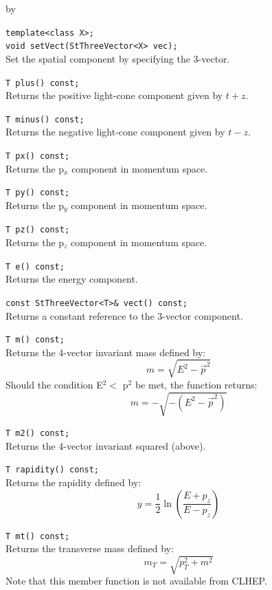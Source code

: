 \documentclass[twoside]{article}
\newcommand{\entrylabel}[1]{\mbox{\textbf{{#1}}}\hfil}%
\newenvironment{entry}
{\begin{list}{}%
    {\renewcommand{\makelabel}{\entrylabel}%
     \setlength{\labelwidth}{90pt}%
     \setlength{\leftmargin}{\labelwidth}
     \advance\leftmargin by \labelsep%
      }%
    }%
  {\end{list}}
\newcommand{\Entrylabel}[1]%
{\raisebox{0pt}[1ex][0pt]{\makebox[\labelwidth][l]%
    {\parbox[t]{\labelwidth}{\hspace{0pt}\textbf{{#1}}}}}}
\newenvironment{Entry}%
{\renewcommand{\entrylabel}{\Entrylabel}\begin{entry}}%
  {\end{entry}}
\begin{document}
\begin{Entry}
    \verb+template<class X>;+\\
    \verb+void setVect(StThreeVector<X> vec);+\\
    Set the spatial component by specifying the 3-vector.

    \verb+T plus() const;+\\
    Returns the positive light-cone component given
    by $t+z$.

    \verb+T minus() const;+\\
    Returns the negative light-cone component given
    by $t-z$.
    
    \verb+T px() const;+\\
    Returns the p$_{x}$ component in momentum space.
    
    \verb+T py() const;+\\
    Returns the p$_{y}$ component in momentum space.
    
    \verb+T pz() const;+\\
    Returns the p$_{z}$ component in momentum space.

    \verb+T e() const;+\\
    Returns the energy component.

    \verb+const StThreeVector<T>& vect() const;+\\
    Returns a constant reference to the 3-vector component.

    \verb+T m() const;+\\
    Returns the 4-vector invariant mass defined
    by:
    \begin{equation*}
      m = \sqrt{E^{2} - \vec{p}^{2}}
    \end{equation*}
    Should the condition E$^{2} < $ p$^{2}$ be met, the
    function returns:
   \begin{equation*}
      m = -\sqrt{-(E^{2} - \vec{p}^{2})}
    \end{equation*}    

    \verb+T m2() const;+\\
    Returns the 4-vector invariant squared (above).
    
    \verb+T rapidity() const;+\\    
    Returns the rapidity defined by: \\
    \begin{equation*}
      y = \frac{1}{2} \ln(\frac{E+p_{z}}{E-p_{z}})
    \end{equation*}

    \verb+T mt() const;+\\    
    Returns the transverse mass defined by: \\
    \begin{equation*}
      m_{T} = \sqrt{p_{T}^{2} + m^{2}}
    \end{equation*}
    Note that this member function is not available
    from CLHEP.


\end{Entry}
\end{document}
